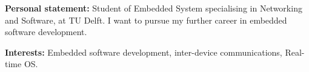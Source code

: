 %
%

\par{
{\textbf{Personal statement:}} 
Student of Embedded System specialising in Networking and Software, at TU Delft. I want to pursue my further career in embedded software development.

{\textbf{Interests:}} 
Embedded software development, inter-device communications, Real-time OS. 
}